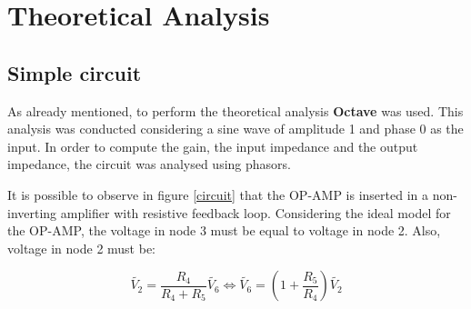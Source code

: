 \newpage
\section{Theoretical Analysis}
\label{sec:analysis}



\subsection{Simple circuit}

As already mentioned, to perform the theoretical analysis {\bf Octave} was used. This analysis was conducted considering a sine wave of amplitude 1 and phase 0 as the input. In order to compute the gain, the input impedance and the output impedance, the circuit was analysed using phasors.

It is possible to observe in figure \ref{circuit} that the OP-AMP is inserted in a non-inverting amplifier with resistive feedback loop. Considering the ideal model for the OP-AMP, the voltage in node 3 must be equal to voltage in node 2. Also, voltage in node 2 must be:

\begin{equation}
        \widetilde{V_2} = \frac{R_4}{R_4+R_5}\widetilde{V_6} \iff \widetilde{V_6} = (1+\frac{R_5}{R_4})\widetilde{V_2}
\end{equation}

